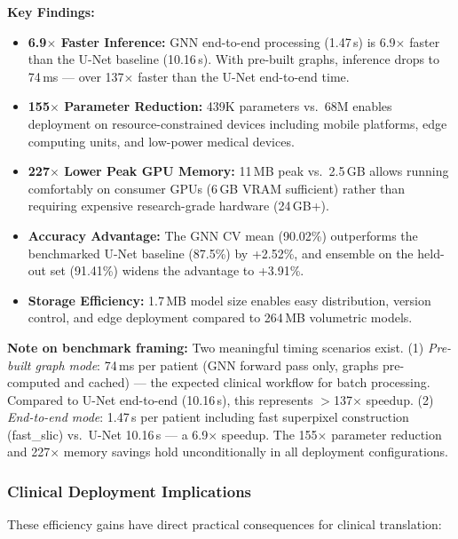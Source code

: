\textbf{Key Findings:}
\begin{itemize}
    \item \textbf{6.9$\times$ Faster Inference:} GNN end-to-end processing (1.47\,s) is 6.9$\times$ faster than the U-Net baseline (10.16\,s). With pre-built graphs, inference drops to 74\,ms — over 137$\times$ faster than the U-Net end-to-end time.

    \item \textbf{155$\times$ Parameter Reduction:} 439K parameters vs.\ 68M enables deployment on resource-constrained devices including mobile platforms, edge computing units, and low-power medical devices.

    \item \textbf{227$\times$ Lower Peak GPU Memory:} 11\,MB peak vs.\ 2.5\,GB allows running comfortably on consumer GPUs (6\,GB VRAM sufficient) rather than requiring expensive research-grade hardware (24\,GB+).

    \item \textbf{Accuracy Advantage:} The GNN CV mean (90.02\%) outperforms the benchmarked U-Net baseline (87.5\%) by +2.52\%, and ensemble on the held-out set (91.41\%) widens the advantage to +3.91\%.

    \item \textbf{Storage Efficiency:} 1.7\,MB model size enables easy distribution, version control, and edge deployment compared to 264\,MB volumetric models.
\end{itemize}

\textbf{Note on benchmark framing:} Two meaningful timing scenarios exist. (1) \textit{Pre-built graph mode}: 74\,ms per patient (GNN forward pass only, graphs pre-computed and cached) — the expected clinical workflow for batch processing. Compared to U-Net end-to-end (10.16\,s), this represents $>$137$\times$ speedup. (2) \textit{End-to-end mode}: 1.47\,s per patient including fast superpixel construction (fast\_slic) vs.\ U-Net 10.16\,s — a 6.9$\times$ speedup. The 155$\times$ parameter reduction and 227$\times$ memory savings hold unconditionally in all deployment configurations.

\subsubsection{Clinical Deployment Implications}

These efficiency gains have direct practical consequences for clinical translation:

